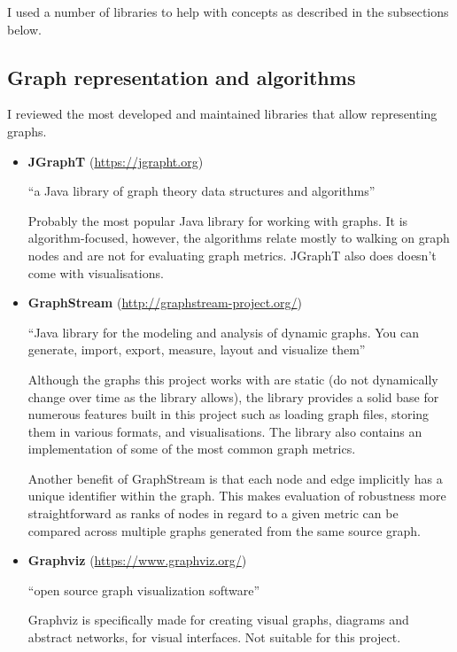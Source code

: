 I used a number of libraries to help with concepts as described in the subsections below.

\subsection{Graph representation and algorithms}

I reviewed the most developed and maintained libraries that allow representing graphs.

\begin{itemize}
    \item \textbf{JGraphT} (\url{https://jgrapht.org})

    \enquote{a Java library of graph theory data structures and algorithms}

    Probably the most popular Java library for working with graphs.
    It is algorithm-focused, however, the algorithms relate mostly to walking on graph nodes and are not for evaluating graph metrics.
    JGraphT also does doesn't come with visualisations.

    \item \textbf{GraphStream} (\url{http://graphstream-project.org/})

    \enquote{Java library for the modeling and analysis of dynamic graphs.
    You can generate, import, export, measure, layout and visualize them}

    Although the graphs this project works with are static (do not dynamically change over time as the library allows), the library provides a solid base for numerous features built in this project such as loading graph files, storing them in various formats, and visualisations.
    The library also contains an implementation of some of the most common graph metrics.

    Another benefit of GraphStream is that each node and edge implicitly has a unique identifier within the graph.
    This makes evaluation of robustness more straightforward as ranks of nodes in regard to a given metric can be compared across multiple graphs generated from the same source graph.

    \item \textbf{Graphviz} (\url{https://www.graphviz.org/})

    \enquote{open source graph visualization software}

    Graphviz is specifically made for creating visual graphs, diagrams and abstract networks, for visual interfaces.
    Not suitable for this project.
\end{itemize}

